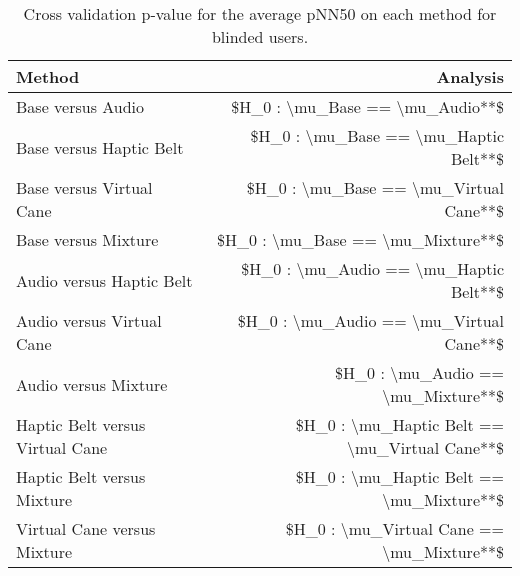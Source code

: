 
\begin{table}[!htb]
\centering
\caption{Cross validation p-value for the average pNN50 on each method for blinded users.}
\label{tab:lsd_average_pnn50}
\begin{tabular}{lr}
\toprule
                         Method &                                      Analysis \\
\midrule
              Base versus Audio &               \$H\_0 : \textbackslash mu\_Base == \textbackslash mu\_Audio**\$ \\
        Base versus Haptic Belt &         \$H\_0 : \textbackslash mu\_Base == \textbackslash mu\_Haptic Belt**\$ \\
       Base versus Virtual Cane &        \$H\_0 : \textbackslash mu\_Base == \textbackslash mu\_Virtual Cane**\$ \\
            Base versus Mixture &             \$H\_0 : \textbackslash mu\_Base == \textbackslash mu\_Mixture**\$ \\
       Audio versus Haptic Belt &        \$H\_0 : \textbackslash mu\_Audio == \textbackslash mu\_Haptic Belt**\$ \\
      Audio versus Virtual Cane &       \$H\_0 : \textbackslash mu\_Audio == \textbackslash mu\_Virtual Cane**\$ \\
           Audio versus Mixture &            \$H\_0 : \textbackslash mu\_Audio == \textbackslash mu\_Mixture**\$ \\
Haptic Belt versus Virtual Cane & \$H\_0 : \textbackslash mu\_Haptic Belt == \textbackslash mu\_Virtual Cane**\$ \\
     Haptic Belt versus Mixture &      \$H\_0 : \textbackslash mu\_Haptic Belt == \textbackslash mu\_Mixture**\$ \\
    Virtual Cane versus Mixture &     \$H\_0 : \textbackslash mu\_Virtual Cane == \textbackslash mu\_Mixture**\$ \\
\bottomrule
\end{tabular}
\end{table}

